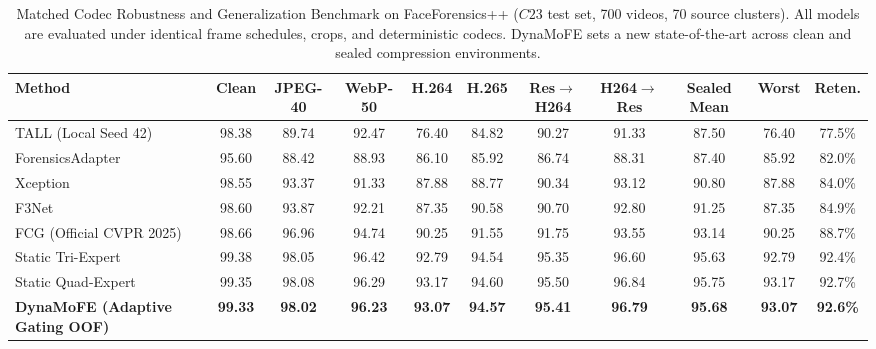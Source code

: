 \begin{table}[t]
\centering
\caption{Matched Codec Robustness and Generalization Benchmark on FaceForensics++ ($C23$ test set, 700 videos, 70 source clusters). All models are evaluated under identical frame schedules, crops, and deterministic codecs. DynaMoFE sets a new state-of-the-art across clean and sealed compression environments.}
\label{tab:main_benchmark}
\small
\begin{tabular}{lcccccccc|cc}
\toprule
\textbf{Method} & \textbf{Clean} & \textbf{JPEG-40} & \textbf{WebP-50} & \textbf{H.264} & \textbf{H.265} & \textbf{Res$\rightarrow$H264} & \textbf{H264$\rightarrow$Res} & \textbf{Sealed Mean} & \textbf{Worst} & \textbf{Reten.} \\
\midrule
TALL (Local Seed 42) & 98.38 & 89.74 & 92.47 & 76.40 & 84.82 & 90.27 & 91.33 & 87.50 & 76.40 & 77.5\% \\
ForensicsAdapter & 95.60 & 88.42 & 88.93 & 86.10 & 85.92 & 86.74 & 88.31 & 87.40 & 85.92 & 82.0\% \\
Xception & 98.55 & 93.37 & 91.33 & 87.88 & 88.77 & 90.34 & 93.12 & 90.80 & 87.88 & 84.0\% \\
F3Net & 98.60 & 93.87 & 92.21 & 87.35 & 90.58 & 90.70 & 92.80 & 91.25 & 87.35 & 84.9\% \\
FCG (Official CVPR 2025) & 98.66 & 96.96 & 94.74 & 90.25 & 91.55 & 91.75 & 93.55 & 93.14 & 90.25 & 88.7\% \\
Static Tri-Expert & 99.38 & 98.05 & 96.42 & 92.79 & 94.54 & 95.35 & 96.60 & 95.63 & 92.79 & 92.4\% \\
Static Quad-Expert & 99.35 & 98.08 & 96.29 & 93.17 & 94.60 & 95.50 & 96.84 & 95.75 & 93.17 & 92.7\% \\
\textbf{DynaMoFE (Adaptive Gating OOF)} & \textbf{99.33} & \textbf{98.02} & \textbf{96.23} & \textbf{93.07} & \textbf{94.57} & \textbf{95.41} & \textbf{96.79} & \textbf{95.68} & \textbf{93.07} & \textbf{92.6\%} \\
\bottomrule
\end{tabular}
\end{table}